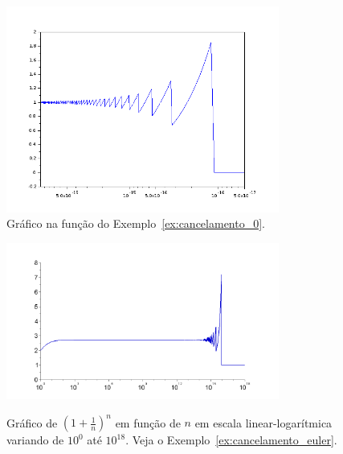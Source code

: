 \begin{figure}
  \centering
  \includegraphics[width=0.8\textwidth]{./cap_aritmetica/pics/cancelamento_0}
  \caption{Gráfico na função do Exemplo~\ref{ex:cancelamento_0}.}
  \label{fig:cancelamento_0}
\end{figure}


\begin{figure}
  \includegraphics[width=0.8\textwidth]{./cap_aritmetica/pics/cancelamento_euler}
  \label{fig:cancelamento_euler}
  \caption{Gráfico de $\left(1+\frac{1}{n}\right)^n$ em função de $n$ em escala linear-logarítmica variando de $10^0$ até $10^{18}$. Veja o Exemplo~\ref{ex:cancelamento_euler}.}
\end{figure}

